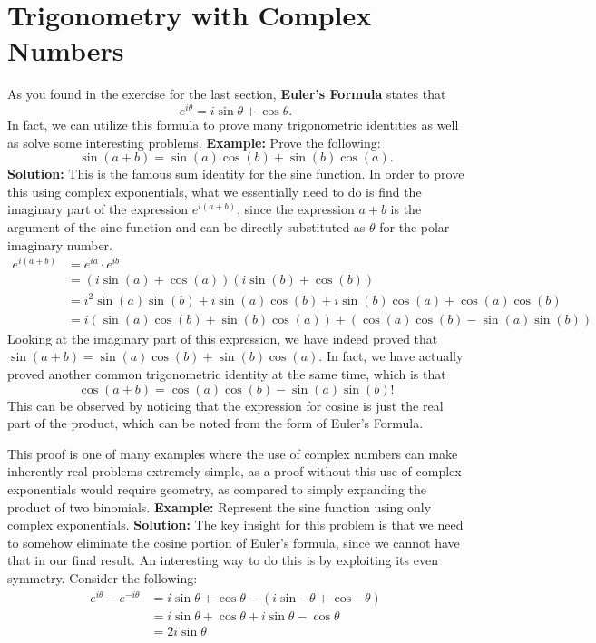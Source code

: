 \documentclass[12pt]{article}
\begin{document}
\section{Trigonometry with Complex Numbers}
As you found in the exercise for the last section, \textbf{Euler's Formula} states that \[ e^{i\theta} = i\sin\theta + \cos\theta. \] In fact, we can utilize this formula to prove many trigonometric identities as well as solve some interesting problems.
\newline\newline
\textbf{Example: } Prove the following: \[ \sin(a + b) = \sin(a)\cos(b) + \sin(b)\cos(a). \] 
\newline
\textbf{Solution: } This is the famous sum identity for the sine function. In order to prove this using complex exponentials, what we essentially need to do is find the imaginary part of the expression $e^{i(a + b)}$, since the expression $a + b$ is the argument of the sine function and can be directly substituted as $\theta$ for the polar imaginary number.
\begin{align*}
    e^{i(a + b)} &= e^{ia} \cdot e^{ib} \\
                 &= (i\sin(a) + \cos(a))(i\sin(b) + \cos(b)) \\
                 &= i^2\sin(a)\sin(b) + i\sin(a)\cos(b) + i\sin(b)\cos(a) + \cos(a)\cos(b) \\
                 &= i(\sin(a)\cos(b) + \sin(b)\cos(a)) + (\cos(a)\cos(b) - \sin(a)\sin(b))
\end{align*}
Looking at the imaginary part of this expression, we have indeed proved that $\sin(a + b) = \sin(a)\cos(b) + \sin(b)\cos(a)$. In fact, we have actually proved another common trigonometric identity at the same time, which is that \[\cos(a + b) = \cos(a)\cos(b) - \sin(a)\sin(b)!\] This can be observed by noticing that the expression for cosine is just the real part of the product, which can be noted from the form of Euler's Formula.

This proof is one of many examples where the use of complex numbers can make inherently real problems extremely simple, as a proof without this use of complex exponentials would require geometry, as compared to simply expanding the product of two binomials.
\newline\newline
\textbf{Example: } Represent the sine function using only complex exponentials.
\newline\newline
\textbf{Solution: } The key insight for this problem is that we need to somehow eliminate the cosine portion of Euler's formula, since we cannot have that in our final result. An interesting way to do this is by exploiting its even symmetry. Consider the following:
\begin{align*}
    e^{i\theta} - e^{-i\theta} &= i\sin{\theta} + \cos{\theta} - (i\sin{-\theta} + \cos{-\theta}) \\
                               &= i\sin{\theta} + \cos{\theta} + i\sin{\theta} - \cos{\theta} \\
                               &= 2i\sin{\theta}
\end{align*}
\end{document}
